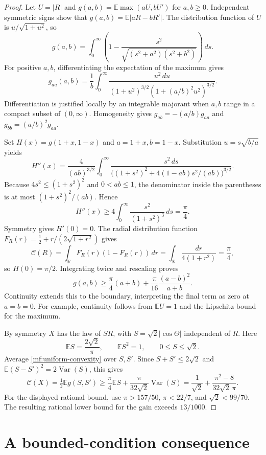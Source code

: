 \begin{proof}
Let \(U=|R|\) and
\(g(a,b)=\mathbb E\max(aU,bU')\) for \(a,b\ge0\).
Independent symmetric signs show that
\(g(a,b)=\mathbb E|aR-bR'|\).
The distribution function of \(U\) is \(u/\sqrt{1+u^2}\), so
\[
 g(a,b)=\int_0^\infty
 \left(1-\frac{s^2}{\sqrt{(s^2+a^2)(s^2+b^2)}}\right)\,ds.
\]
For positive \(a,b\), differentiating the expectation of the maximum
gives
\[
 g_{aa}(a,b)=\frac1b\int_0^\infty
 \frac{u^2\,du}
 {(1+u^2)^{3/2}(1+(a/b)^2u^2)^{3/2}}.
\]
Differentiation is justified locally by an integrable majorant when
\(a,b\) range in a compact subset of \((0,\infty)\).
Homogeneity gives \(g_{ab}=-(a/b)g_{aa}\) and
\(g_{bb}=(a/b)^2g_{aa}\).

Set \(H(x)=g(1+x,1-x)\) and \(a=1+x,b=1-x\).
Substitution \(u=s\sqrt{b/a}\) yields
\[
 H''(x)=\frac4{(ab)^{3/2}}\int_0^\infty
 \frac{s^2\,ds}
 {\bigl((1+s^2)^2+4(1-ab)s^2/(ab)\bigr)^{3/2}}.
\]
Because \(4s^2\le(1+s^2)^2\) and \(0<ab\le1\), the denominator
inside the parentheses is at most \((1+s^2)^2/(ab)\).
Hence
\[
 H''(x)\ge4\int_0^\infty\frac{s^2}{(1+s^2)^3}\,ds
          =\frac\pi4.
\]
Symmetry gives \(H'(0)=0\).
The radial distribution function
\(F_R(r)=\tfrac12+r/(2\sqrt{1+r^2})\) gives
\[
 \mathcal C(R)=\int_{\mathbb R}F_R(r)(1-F_R(r))\,dr
             =\int_{\mathbb R}\frac{dr}{4(1+r^2)}=\frac\pi4,
\]
so \(H(0)=\pi/2\).
Integrating twice and rescaling proves
\begin{equation}\label{mf:uniform-convexity}
 g(a,b)\ge\frac\pi4(a+b)
               +\frac\pi{16}\frac{(a-b)^2}{a+b}.
\end{equation}
Continuity extends this to the boundary, interpreting the final term as
zero at \(a=b=0\). For example, continuity follows from
\(\mathbb E U=1\) and the Lipschitz bound for the maximum.

By symmetry \(X\) has the law of \(SR\), with
\(S=\sqrt2|\cos\Theta|\) independent of \(R\).
Here
\[
 \mathbb ES=\frac{2\sqrt2}{\pi},\qquad
 \mathbb ES^2=1,\qquad 0\le S\le\sqrt2.
\]
Average \eqref{mf:uniform-convexity} over \(S,S'\). Since
\(S+S'\le2\sqrt2\) and
\(\mathbb E(S-S')^2=2\operatorname{Var}(S)\), this gives
\[
 \mathcal C(X)=\tfrac12\mathbb Eg(S,S')
 \ge\frac\pi4\mathbb ES+\frac{\pi}{32\sqrt2}\operatorname{Var}(S)
 =\frac1{\sqrt2}+\frac{\pi^2-8}{32\sqrt2\,\pi}.
\]
For the displayed rational bound, use
\(\pi>157/50\), \(\pi<22/7\), and \(\sqrt2<99/70\).
The resulting rational lower bound for the gain exceeds \(13/1000\).
\end{proof}

\section{A bounded-condition consequence}\label{mf:concrete}

